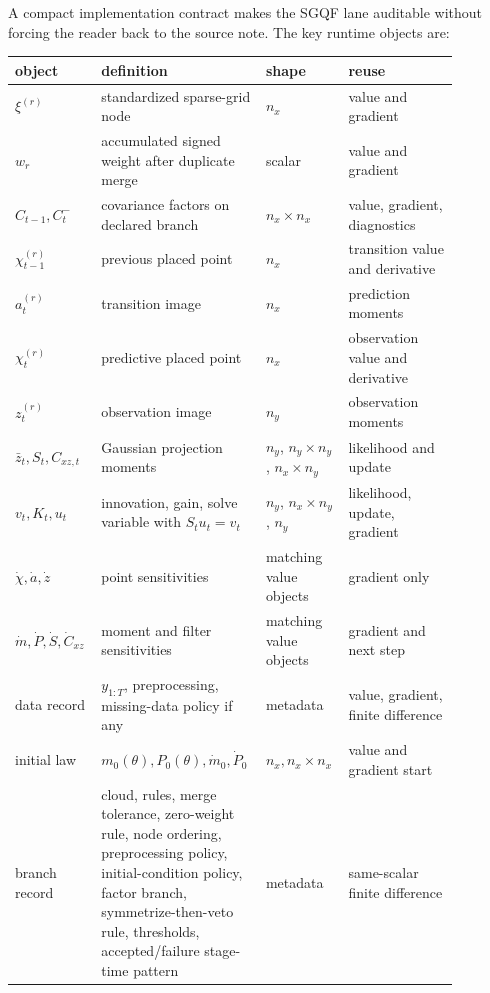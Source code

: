 A compact implementation contract makes the SGQF lane auditable without forcing
the reader back to the source note.  The key runtime objects are:
\begin{center}
\small
\begin{tabular}{p{0.18\linewidth}p{0.30\linewidth}p{0.16\linewidth}p{0.24\linewidth}}
\toprule
object & definition & shape & reuse \\
\midrule
\(\xi^{(r)}\) & standardized sparse-grid node & \(n_x\) & value and gradient \\
\(w_r\) & accumulated signed weight after duplicate merge & scalar & value and gradient \\
\(C_{t-1},C_t^-\) & covariance factors on declared branch & \(n_x\times n_x\) & value, gradient, diagnostics \\
\(\chi_{t-1}^{(r)}\) & previous placed point & \(n_x\) & transition value and derivative \\
\(a_t^{(r)}\) & transition image & \(n_x\) & prediction moments \\
\(\chi_t^{(r)}\) & predictive placed point & \(n_x\) & observation value and derivative \\
\(z_t^{(r)}\) & observation image & \(n_y\) & observation moments \\
\(\bar z_t,S_t,C_{xz,t}\) & Gaussian projection moments & \(n_y\), \(n_y\times n_y\), \(n_x\times n_y\) & likelihood and update \\
\(v_t,K_t,u_t\) & innovation, gain, solve variable with \(S_tu_t=v_t\) & \(n_y\), \(n_x\times n_y\), \(n_y\) & likelihood, update, gradient \\
\(\dot\chi,\dot a,\dot z\) & point sensitivities & matching value objects & gradient only \\
\(\dot m,\dot P,\dot S,\dot C_{xz}\) & moment and filter sensitivities & matching value objects & gradient and next step \\
data record & \(y_{1:T}\), preprocessing, missing-data policy if any & metadata & value, gradient, finite difference \\
initial law & \(m_0(\theta),P_0(\theta),\dot m_0,\dot P_0\) & \(n_x,n_x\times n_x\) & value and gradient start \\
branch record & cloud, rules, merge tolerance, zero-weight rule, node ordering, preprocessing policy, initial-condition policy, factor branch, symmetrize-then-veto rule, thresholds, accepted/failure stage-time pattern & metadata & same-scalar finite difference \\
\bottomrule
\end{tabular}
\end{center}

